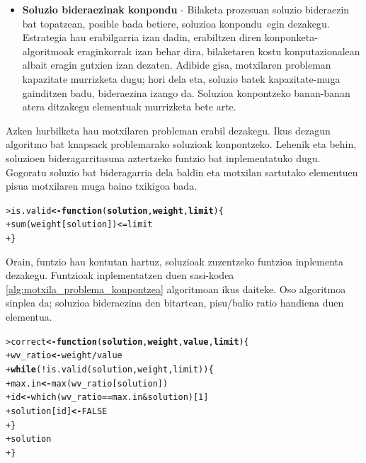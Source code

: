 \documentclass[eu]{ifirak}\usepackage[]{graphicx}\usepackage[]{color}
\makeatletter
\newcommand{\hlnum}[1]{\textcolor[rgb]{0.659,0.4,0.051}{#1}}%
\newcommand{\hlopt}[1]{\textcolor[rgb]{0,0,0}{#1}}%
\newcommand{\hlstd}[1]{\textcolor[rgb]{0,0,0}{#1}}%
\newcommand{\hlkwa}[1]{\textcolor[rgb]{0.133,0.224,0.659}{\textbf{#1}}}%
\newcommand{\hlkwb}[1]{\textcolor[rgb]{0.549,0.114,0.412}{\textbf{#1}}}%
\newcommand{\hlkwc}[1]{\textcolor[rgb]{0.659,0.573,0.133}{\textbf{#1}}}%
\newcommand{\hlkwd}[1]{\textcolor[rgb]{0.659,0.133,0.482}{#1}}%
\newenvironment{kframe}{%
 \def\at@end@of@kframe{}%
 \ifinner\ifhmode%
  \def\at@end@of@kframe{\end{minipage}}%
  \begin{minipage}{\columnwidth}%
 \fi\fi%
 \def\FrameCommand##1{\hskip\@totalleftmargin \hskip-\fboxsep
 \colorbox{shadecolor}{##1}\hskip-\fboxsep
     \hskip-\linewidth \hskip-\@totalleftmargin \hskip\columnwidth}%
 \MakeFramed {\advance\hsize-\width
   \@totalleftmargin\z@ \linewidth\hsize
   \@setminipage}}%
 {\par\unskip\endMakeFramed%
 \at@end@of@kframe}
\newenvironment{knitrout}{}{} %
\newcommand{\zkk}{\guillemotleft}
\newcommand{\skk}{\guillemotright}
\makeatother
\begin{document}
\begin{itemize}
\item \textbf{Soluzio bideraezinak konpondu} - Bilaketa prozesuan soluzio bideraezin bat topatzean, posible bada betiere, soluzioa \zkk konpondu\skk\ egin dezakegu. Estrategia hau erabilgarria izan dadin, erabiltzen diren konponketa-algoritmoak eraginkorrak izan behar dira, bilaketaren kostu konputazionalean albait eragin gutxien izan dezaten. Adibide gisa, motxilaren probleman kapazitate murrizketa dugu; hori dela eta, soluzio batek kapazitate-muga gainditzen badu, bideraezina izango da. Soluzioa konpontzeko banan-banan atera ditzakegu elementuak murrizketa bete arte.
\end{itemize}

Azken hurbilketa hau motxilaren probleman erabil dezakegu. Ikus dezagun algoritmo bat knapsack problemarako soluzioak konpontzeko. Lehenik eta behin, soluzioen bideragarritasuna aztertzeko funtzio bat inplementatuko dugu. Gogoratu soluzio bat bideragarria dela baldin eta motxilan sartutako elementuen pisua motxilaren muga baino txikigoa bada.

\begin{knitrout}
\color{fgcolor}\begin{kframe}
\begin{alltt}
\hlstd{> }\hlstd{is.valid} \hlkwb{<-} \hlkwa{function}\hlstd{(}\hlkwc{solution}\hlstd{,} \hlkwc{weight}\hlstd{,} \hlkwc{limit}\hlstd{)\{}
\hlstd{+ }    \hlkwd{sum}\hlstd{(weight[solution])} \hlopt{<=} \hlstd{limit}
\hlstd{+ }\hlstd{\}}
\end{alltt}
\end{kframe}
\end{knitrout}

Orain, funtzio hau kontutan hartuz, soluzioak zuzentzeko funtzioa inplementa dezakegu. Funtzioak inplementatzen duen sasi-kodea \ref{alg:motxila_problema_konpontzea} algoritmoan ikus daiteke. Oso algoritmoa sinplea da; soluzioa bideraezina den bitartean, pisu/balio ratio handiena duen elementua. 

\begin{knitrout}
\color{fgcolor}\begin{kframe}
\begin{alltt}
\hlstd{> }\hlstd{correct} \hlkwb{<-} \hlkwa{function}\hlstd{(}\hlkwc{solution} \hlstd{,} \hlkwc{weight} \hlstd{,} \hlkwc{value} \hlstd{,} \hlkwc{limit}\hlstd{)\{}
\hlstd{+ }  \hlstd{wv_ratio}\hlkwb{<-}\hlstd{weight}\hlopt{/}\hlstd{value}
\hlstd{+ }  \hlkwa{while}\hlstd{(}\hlopt{!}\hlkwd{is.valid}\hlstd{(solution , weight , limit))\{}
\hlstd{+ }    \hlstd{max.in} \hlkwb{<-} \hlkwd{max}\hlstd{(wv_ratio[solution])}
\hlstd{+ }    \hlstd{id} \hlkwb{<-} \hlkwd{which}\hlstd{(wv_ratio}\hlopt{==}\hlstd{max.in} \hlopt{&} \hlstd{solution)[}\hlnum{1}\hlstd{]}
\hlstd{+ }    \hlstd{solution[id]} \hlkwb{<-} \hlnum{FALSE}
\hlstd{+ }  \hlstd{\}}
\hlstd{+ }  \hlstd{solution}
\hlstd{+ }\hlstd{\}}
\end{alltt}
\end{kframe}
\end{knitrout}
\end{document}
